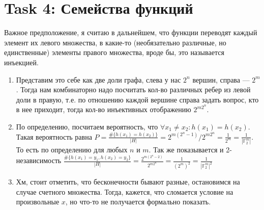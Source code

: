 \section{Task 4: Семейства функций}
\begin{solution}
    Важное предположение, я считаю в дальнейшем, что функции переводят каждый элемент их левого множества, в какие-то (необязательно различные, но единственные) элементы правого множества, вроде бы, это называется инъекцией.
    \begin{enumerate}
        \item Представим это себе как две доли графа, слева у нас $2^n$ вершин, справа --- $2^m$. Тогда нам комбинаторно надо посчитать кол-во различных ребер из левой доли в правую, т.е. по отношению каждой вершине справа задать вопрос, кто в нее приходит, тогда кол-во инъективных отображению $2^{m2^n}$.
        \item По определению, посчитаем вероятность, что $\forall x_1 \neq x_2: h(x_1) = h(x_2)$. Такая вероятность равна $P = \frac{\#\{h(x_1) = h(x_2)\}}{|H|} = 2^{m(2^n - 1)}/2^{m2^n} = \frac{1}{2^m} = \frac{1}{|\mathbb{F}_2^m|}$. То есть по определению для любых $n$ и $m$. Так же показывается и 2-независимость $\frac{\#\{h(x_1) = y_1, h(x_2) = y_2\}}{|H|} = \frac{2^{m(2^n - 2)}}{2^{m2^n}} = \frac{1}{(2^m)^2} = \frac{1}{|\mathbb{F}_2^m|^2}$
        \item Хм, стоит отметить, что бесконечности бывают разные, остановимся на случае счетного множества. Тогда, кажется, что сломается условие на произвольные $x$, но что-то не получается формально показать.
    \end{enumerate}
\end{solution}

